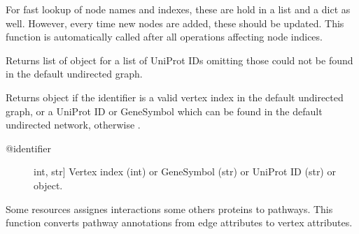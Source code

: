 \documentclass[letterpaper,10pt,english]{sphinxmanual}
\begin{document}
\begin{fulllineitems}
\begin{fulllineitems}
\end{fulllineitems}


\begin{fulllineitems}
\label{\detokenize{main:pypath.main.PyPath.update_vname}}
For fast lookup of node names and indexes, these are
hold in a list and a dict as well. However, every time
new nodes are added, these should be updated. This
function is automatically called after all operations
affecting node indices.

\end{fulllineitems}


\begin{fulllineitems}
\label{\detokenize{main:pypath.main.PyPath.ups}}
Returns list of  object
for a list of UniProt IDs omitting those
could not be found in the default
undirected graph.

\end{fulllineitems}


\begin{fulllineitems}
\label{\detokenize{main:pypath.main.PyPath.v}}
Returns  object if the identifier
is a valid vertex index in the default undirected graph,
or a UniProt ID or GeneSymbol which can be found in the
default undirected network, otherwise .
\begin{description}
\item[{@identifier}] \leavevmode{[}int, str{]}
Vertex index (int) or GeneSymbol (str) or UniProt ID (str) or
 object.

\end{description}

\end{fulllineitems}


\begin{fulllineitems}
\label{\detokenize{main:pypath.main.PyPath.vertex_pathways}}
Some resources assignes interactions some others
proteins to pathways.
This function converts pathway annotations from
edge attributes to vertex attributes.


\end{fulllineitems}
\end{fulllineitems}
\end{document}
